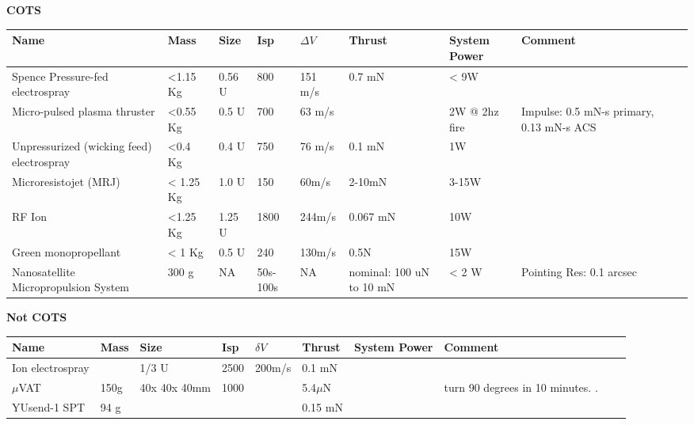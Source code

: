 \documentclass[english]{article}
\begin{document}
{\bf COTS}
\begin{center}
     \begin{tabular}{ |p{2cm} | p{1cm} | p{1cm} |  p{1cm} | l | p{2cm} | l | p{4cm} | p{1cm} | p{3cm} |  }
     \hline

       {\bf Name} & {\bf Mass} & {\bf Size} & {\bf Isp} & {\bf $\Delta V$} & {\bf Thrust} & {\bf System Power}&{\bf Comment}  \\ \hline


     Spence Pressure-fed electrospray \cite{Spence} & <1.15 Kg& 0.56 U& 800 & 151 m/s & 0.7 mN &< 9W &   \\ \hline

     Micro-pulsed plasma thruster \cite{Spence} & <0.55 Kg& 0.5 U & 700 & 63 m/s&  & 2W @ 2hz fire &  Impulse: 0.5 mN-s primary, 0.13 mN-s ACS\\ \hline

     Unpressurized (wicking feed) electrospray \cite{Spence} & <0.4 Kg& 0.4 U& 750 & 76 m/s & 0.1 mN & 1W &  \\
     \hline

     Microresistojet (MRJ) \cite{Spence} & < 1.25 Kg& 1.0 U&150 & 60m/s & 2-10mN & 3-15W&   \\
     \hline

     RF Ion \cite{Spence} & <1.25 Kg& 1.25 U& 1800 & 244m/s & 0.067 mN &10W &   \\
     \hline

     Green monopropellant \cite{Spence} & < 1 Kg& 0.5 U& 240 & 130m/s & 0.5N & 15W&   \\
     \hline

	Nanosatellite Micropropulsion System \cite{Spence} & 300 g & NA &	50s-100s & NA & nominal: 100 uN to 10 mN & < 2 W & Pointing Res: 0.1 arcsec \\ \hline

     \end{tabular}
\end{center}


{\bf Not COTS}
\begin{center}
     \begin{tabular}{ |p{2cm} | p{1cm} | p{1cm} |  p{1cm} | l | l | l | p{5cm} | p{1cm} | p{2cm} |  }
     \hline

       {\bf Name} & {\bf Mass} & {\bf Size} & {\bf Isp} & {\bf $\delta V$} & {\bf Thrust} & {\bf System Power}&{\bf Comment}  \\ \hline

     Ion electrospray \cite{Ref:thr9} & & 1/3 U & 2500 & 200m/s & 0.1 mN& & \\ \hline
     {$\mu$}VAT&150g& 40x 40x 40mm & 1000&   & 5.4{$\mu$}N& & turn 90 degrees in 10 minutes. .\\ \hline
     YUsend-1 SPT \cite{Ref:thr10} &94 g &   &   &   & 0.15 mN& & \\ \hline
     \end{tabular}
\end{center}
\end{document}
